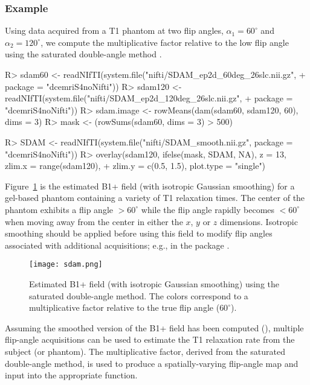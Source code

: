 \documentclass[article]{jss}
\begin{document}
\subsubsection{Example}
Using data acquired from a T1 phantom at two flip angles,
$\alpha_1=60^\circ$ and $\alpha_2=120^\circ$, we compute the
multiplicative factor relative to the low flip angle using the
saturated double-angle method \citep{cun-pau-nay:saturated}.
  
\begin{Schunk}
\begin{Sinput}
R> sdam60 <- readNIfTI(system.file("nifti/SDAM_ep2d_60deg_26slc.nii.gz", 
+     package = "dcemriS4noNifti"))
R> sdam120 <- readNIfTI(system.file("nifti/SDAM_ep2d_120deg_26slc.nii.gz", 
+     package = "dcemriS4noNifti"))
R> sdam.image <- rowMeans(dam(sdam60, sdam120, 60), dims = 3)
R> mask <- (rowSums(sdam60, dims = 3) > 500)
\end{Sinput}
\end{Schunk}
\begin{Schunk}
\begin{Sinput}
R> SDAM <- readNIfTI(system.file("nifti/SDAM_smooth.nii.gz", package = "dcemriS4noNifti"))
R> overlay(sdam120, ifelse(mask, SDAM, NA), z = 13, zlim.x = range(sdam120), 
+     zlim.y = c(0.5, 1.5), plot.type = "single")
\end{Sinput}
\end{Schunk}

Figure~\ref{fig:sdam} is the estimated B1+ field (with isotropic
Gaussian smoothing) for a gel-based phantom containing a variety of T1
relaxation times.  The center of the phantom exhibits a flip angle
$>60^\circ$ while the flip angle rapidly becomes $<60^\circ$ when
moving away from the center in either the $x$, $y$ or $z$ dimensions.
Isotropic smoothing should be applied before using this field to
modify flip angles associated with additional acquisitions; e.g., in
the  package \citep{AnalyzeFMRI}.
  
\begin{figure}[!htbp]
  \centering
  \texttt{[image: sdam.png]}
  \caption{Estimated B1+ field (with isotropic Gaussian smoothing)
    using the saturated double-angle method.  The colors correspond to
    a multiplicative factor relative to the true flip angle
    ($60^\circ$).}
  \label{fig:sdam}
\end{figure}

Assuming the smoothed version of the B1+ field has been computed
(), multiple flip-angle acquisitions can be used to estimate
the T1 relaxation rate from the subject (or phantom).  The
multiplicative factor, derived from the saturated double-angle method,
is used to produce a spatially-varying flip-angle map and input into
the appropriate function.
\end{document}
